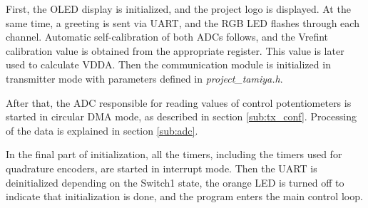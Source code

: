 First, the OLED display is initialized, and the project logo is displayed. At the same time, a greeting is sent via UART, and the RGB LED flashes through each channel. Automatic self-calibration of both ADCs follows, and the Vrefint calibration value is obtained from the appropriate register. This value is later used to calculate VDDA. Then the communication module is initialized in transmitter mode with parameters defined in \textit{project\_tamiya.h}.

After that, the ADC responsible for reading values of control potentiometers is started in circular DMA mode, as described in section \ref{sub:tx_conf}. Processing of the data is explained in section \ref{sub:adc}.

In the final part of initialization, all the timers, including the timers used for quadrature encoders, are started in interrupt mode. Then the UART is deinitialized depending on the Switch1 state, the orange LED is turned off to indicate that initialization is done, and the program enters the main control loop.

